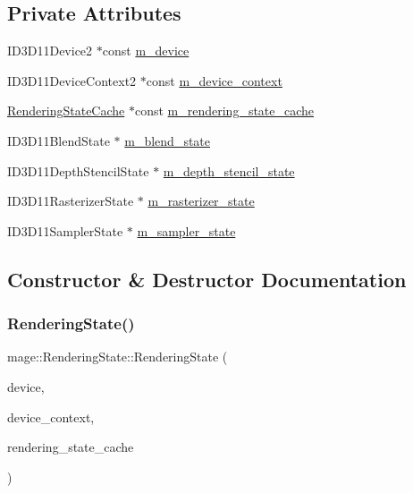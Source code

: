 \subsection*{Private Attributes}
\begin{DoxyCompactItemize}
\item 
I\+D3\+D11\+Device2 $\ast$const \hyperlink{structmage_1_1_rendering_state_a7985712bda141bfac079d4fb6d85cfec}{m\+\_\+device}
\item 
I\+D3\+D11\+Device\+Context2 $\ast$const \hyperlink{structmage_1_1_rendering_state_a13e46783f38a60fe032dc2aad708ec48}{m\+\_\+device\+\_\+context}
\item 
\hyperlink{structmage_1_1_rendering_state_cache}{Rendering\+State\+Cache} $\ast$const \hyperlink{structmage_1_1_rendering_state_a8d422a14392f89eec1ece2d917511168}{m\+\_\+rendering\+\_\+state\+\_\+cache}
\item 
I\+D3\+D11\+Blend\+State $\ast$ \hyperlink{structmage_1_1_rendering_state_ab08e5f63a1bd463ce6029eaaf3526ae4}{m\+\_\+blend\+\_\+state}
\item 
I\+D3\+D11\+Depth\+Stencil\+State $\ast$ \hyperlink{structmage_1_1_rendering_state_a2428412ad160c0d4dd2538c3a9cc863f}{m\+\_\+depth\+\_\+stencil\+\_\+state}
\item 
I\+D3\+D11\+Rasterizer\+State $\ast$ \hyperlink{structmage_1_1_rendering_state_a63b8c00bd0e2e1c56bd2a42f269733a8}{m\+\_\+rasterizer\+\_\+state}
\item 
I\+D3\+D11\+Sampler\+State $\ast$ \hyperlink{structmage_1_1_rendering_state_a88c58f587b9670d662aef5a3a52fa38d}{m\+\_\+sampler\+\_\+state}
\end{DoxyCompactItemize}


\subsection{Constructor \& Destructor Documentation}
\hypertarget{structmage_1_1_rendering_state_a6a1914effafb160ff1d05c8a1963278a}{}\label{structmage_1_1_rendering_state_a6a1914effafb160ff1d05c8a1963278a} 
\subsubsection{\texorpdfstring{Rendering\+State()}{RenderingState()}\hspace{0.1cm}{\footnotesize\ttfamily [1/3]}}
{\footnotesize\ttfamily mage\+::\+Rendering\+State\+::\+Rendering\+State (\begin{DoxyParamCaption}\item[{I\+D3\+D11\+Device2 $\ast$}]{device,  }\item[{I\+D3\+D11\+Device\+Context2 $\ast$}]{device\+\_\+context,  }\item[{\hyperlink{structmage_1_1_rendering_state_cache}{Rendering\+State\+Cache} $\ast$}]{rendering\+\_\+state\+\_\+cache }\end{DoxyParamCaption})\hspace{0.3cm}{\ttfamily [explicit]}}

